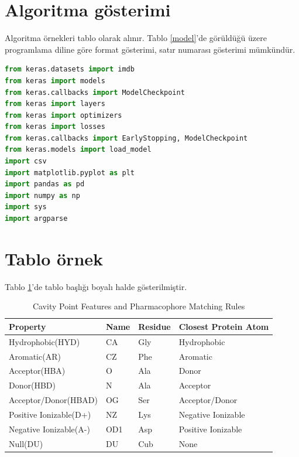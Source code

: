 \section{Algoritma gösterimi}

Algoritma örnekleri tablo olarak alınır. Tablo \ref{model}'de görüldüğü üzere programlama diline göre format gösterimi, satır numarası gösterimi mümkündür.

\begin{lstlisting}[language=python, caption=Construction of the Model , label=model]
from keras.datasets import imdb
from keras import models
from keras.callbacks import ModelCheckpoint
from keras import layers
from keras import optimizers
from keras import losses
from keras.callbacks import EarlyStopping, ModelCheckpoint
from keras.models import load_model
import csv
import matplotlib.pyplot as plt
import pandas as pd
import numpy as np
import sys
import argparse

\end{lstlisting}

\section{Tablo örnek}

Tablo \ref{phardesc}'de tablo başlığı boyalı halde gösterilmiştir.

\begin{table}[!ht]
\caption{Cavity Point Features and Pharmacophore Matching Rules}
\centering
\begin{tabular}{l l l l}
\rowcolor{gray!25}
\toprule
\textbf{Property}    &\textbf{Name}  &\textbf{Residue}     &\textbf{Closest Protein Atom} \\ 
\midrule
Hydrophobic(HYD)    &CA   &Gly    &Hydrophobic        \\ 
Aromatic(AR)     &CZ  &Phe    &Aromatic                \\ 
Acceptor(HBA)   &O    &Ala    &Donor                   \\ 
Donor(HBD)      &N   &Ala     &Acceptor      \\ 
Acceptor/Donor(HBAD)  &OG   & Ser      &Acceptor/Donor \\ 
Positive Ionizable(D+)  &NZ   & Lys    &Negative Ionizable    \\ 
Negative Ionizable(A-)  &OD1   & Asp   &Positive Ionizable     \\ 
Null(DU)  &DU   &Cub      &None     \\ 
\bottomrule
\end{tabular}
\label{phardesc}
\end{table}
